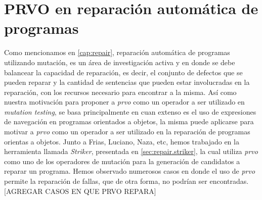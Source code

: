 \section{PRVO en reparaci\'on autom\'atica de programas}

Como mencionamos en \ref{cap:repair}, reparaci\'on autom\'atica de programas utilizando mutaci\'on, es un \'area de investigaci\'on activa y en donde se debe balancear la capacidad de reparaci\'on, es decir, el conjunto de defectos que se pueden reparar y la cantidad de sentencias que pueden estar involucradas en la reparaci\'on, con los recursos necesario para encontrar a la misma. As\'i como nuestra motivaci\'on para proponer a \emph{prvo} como un operador a ser utilizado en \emph{mutation testing}, se basa principalmente en cuan extenso es el uso de expresiones de navegaci\'on en programas orientados a objetos, la misma puede aplicarse para motivar a \emph{prvo} como un operador a ser utilizado en la reparaci\'on de programas orientas a objetos. Junto a Frias, Luciano, Naza, etc, hemos trabajado en la herramienta llamada \emph{Striker}, presentada en \ref{sec:repair.striker}, la cual utiliza \emph{prvo} como uno de los operadores de mutaci\'on para la generaci\'on de candidatos a reparar un programa. Hemos observado numerosos casos en donde el uso de \emph{prvo} permite la reparaci\'on de fallas, que de otra forma, no podr\'ian ser encontradas. [AGREGAR CASOS EN QUE PRVO REPARA]